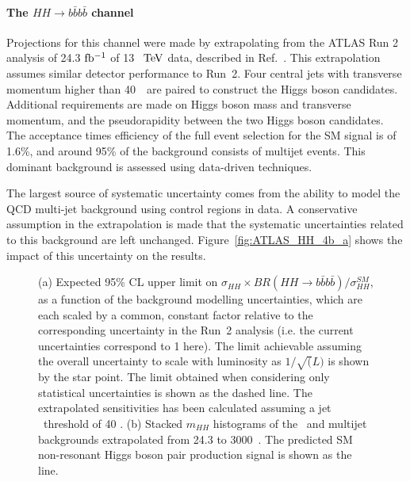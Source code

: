 %
\paragraph{The $HH \rightarrow b\bar{b}b\bar{b}$ channel}

Projections for this channel were made by extrapolating from the ATLAS Run 2 analysis of 24.3 $\mbox{fb$^{-1}$}$ of 13~$~\text{TeV}$ data, described in Ref.~\cite{ITKPixelTDR}. This extrapolation assumes similar detector performance to Run~2. Four central jets with transverse momentum higher than 40~\UGeV\ are paired to construct the Higgs boson candidates. Additional requirements are made on Higgs boson mass and transverse momentum, and the pseudorapidity between the two Higgs boson candidates.
The acceptance times efficiency of the full event selection for the SM signal is of 1.6\%, and around 95\% of the background consists of multijet events. This dominant background is assessed using data-driven techniques. 

The largest source of systematic uncertainty comes from the ability to model the QCD multi-jet background using control regions in data. A conservative assumption in the extrapolation is made that the systematic uncertainties related to this background are left unchanged. Figure~\ref{fig:ATLAS_HH_4b_a} shows the impact of this uncertainty on the results.


\begin{figure}[!htb]
\centering 
{} 
\caption{(a) Expected 95\% CL upper limit on $\sigma_{HH} \times BR(HH \rightarrow b\bar{b}b\bar{b})/\sigma_{HH}^{SM}$, as a function of the background modelling uncertainties, which are each scaled by a common, constant factor relative to the corresponding uncertainty in the Run~2 analysis (i.e. the current uncertainties correspond to 1 here). 
The limit achievable assuming the overall uncertainty to scale with luminosity as $1/\sqrt(L)$ is shown by the star point.
The limit obtained when considering only statistical uncertainties is shown as the dashed line.
The extrapolated sensitivities has been calculated assuming a jet \pt\ threshold of 40 \GeV. (b) Stacked $m_{HH}$ histograms of the \ttbar\ and multijet backgrounds extrapolated from 24.3 to 3000~\ifb.
The predicted SM non-resonant Higgs boson pair production signal is shown as the line.} 
\label{fig:ATLAS_HH_4b} 
\end{figure}

